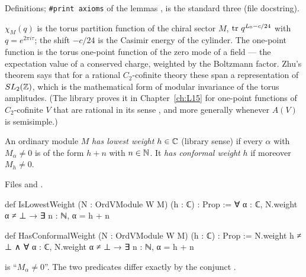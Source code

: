 \begin{status}
Definitions; \texttt{\#print axioms} of the lemmas ,  is the
standard three (file docstring).
\end{status}

\begin{physics}
$\chi_M(q)$ is the torus partition function of the chiral sector $M$, $\operatorname{tr}\,q^{L_0-c/24}$ with $q = e^{2\pi i\tau}$;
the shift $-c/24$ is the Casimir energy of the cylinder. The one-point function is the torus one-point
function of the zero mode of a field --- the expectation value of a conserved charge, weighted by the
Boltzmann factor. Zhu's theorem says that for a rational $C_2$-cofinite theory these span a representation of
$SL_2({\mathbb{Z}})$, which is the mathematical form of modular invariance of the torus amplitudes. (The library proves it in
Chapter~\ref{ch:L15} for one-point functions of $C_2$-cofinite $V$ that are rational in its sense
, and more generally whenever $A(V)$ is semisimple.)
\end{physics}

\begin{definition}\label{l12:def:lowest}
An ordinary module $M$ \emph{has lowest weight} $h\in{\mathbb{C}}$ (library sense) if every $\alpha$ with
$M_\alpha\neq0$ is of the form $h+n$ with $n\in{\mathbb{N}}$. It \emph{has conformal weight} $h$ if moreover
$M_h\neq0$.
\end{definition}
\noindent Files  and
.
\begin{leancode}
def IsLowestWeight (N : OrdVModule W M) (h : ℂ) : Prop :=
  ∀ α : ℂ, N.weight α ≠ ⊥ → ∃ n : ℕ, α = h + n

def HasConformalWeight (N : OrdVModule W M) (h : ℂ) : Prop :=
  N.weight h ≠ ⊥ ∧ ∀ α : ℂ, N.weight α ≠ ⊥ → ∃ n : ℕ, α = h + n
\end{leancode}

\begin{dictionary}
 is ``$M_\alpha\neq0$''. The two predicates differ exactly by the conjunct
.
\end{dictionary}

